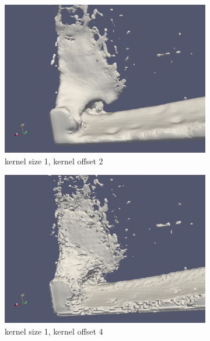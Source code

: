 \begin{figure}
\begin{subfigure}[b]{0.5\textwidth}
               \includegraphics[width=\textwidth]{figures/DBBlur_ks-1_ko-2_2.png}
               \caption{kernel size 1, kernel offset 2}
               \label{fig:ks1ko22}
        \end{subfigure}
        \begin{subfigure}[b]{0.5\textwidth}
               \includegraphics[width=\textwidth]{figures/DBBlur_ks-1_ko-4_2.png}
               \caption{kernel size 1, kernel offset 4}
               \label{fig:ks1ko42}
        \end{subfigure}
        \begin{subfigure}[b]{0.5\textwidth}

\end{subfigure}
\end{figure}
